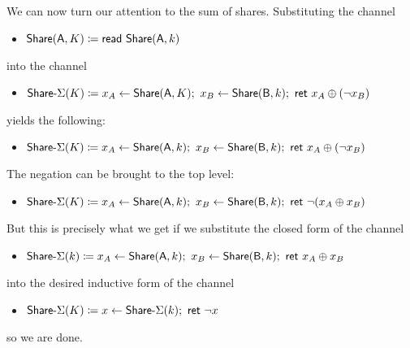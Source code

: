 \begin{itemize}
We can now turn our attention to the sum of shares. Substituting the channel
\begin{itemize}
\item $\mathsf{Share}(\mathsf{A},K) \coloneqq \mathsf{read} \ \mathsf{Share}(\mathsf{A},k)$
\end{itemize}
into the channel
\begin{itemize}
\item $\mathsf{Share}\textsf{-}\Sigma(K) \coloneqq x_A \leftarrow \mathsf{Share}(\mathsf{A},K); \ x_B \leftarrow \mathsf{Share}(\mathsf{B},k); \ \mathsf{ret} \ x_A \oplus (\neg x_B)$
\end{itemize}
yields the following:
\begin{itemize}
\item $\mathsf{Share}\textsf{-}\Sigma(K) \coloneqq x_A \leftarrow \mathsf{Share}(\mathsf{A},k); \ x_B \leftarrow \mathsf{Share}(\mathsf{B},k); \ \mathsf{ret} \ x_A \oplus (\neg x_B)$
\end{itemize}
The negation can be brought to the top level:
\begin{itemize}
\item $\mathsf{Share}\textsf{-}\Sigma(K) \coloneqq x_A \leftarrow \mathsf{Share}(\mathsf{A},k); \ x_B \leftarrow \mathsf{Share}(\mathsf{B},k); \ \mathsf{ret} \ \neg (x_A \oplus x_B)$
\end{itemize}
But this is precisely what we get if we substitute the closed form of the channel
\begin{itemize}
\item $\mathsf{Share}\textsf{-}\Sigma(k) \coloneqq x_A \leftarrow \mathsf{Share}(\mathsf{A},k); \ x_B \leftarrow \mathsf{Share}(\mathsf{B},k); \ \mathsf{ret} \ x_A \oplus x_B$
\end{itemize}
into the desired inductive form of the channel
\begin{itemize}
\item $\mathsf{Share}\textsf{-}\Sigma(K) \coloneqq x \leftarrow \mathsf{Share}\textsf{-}\Sigma(k); \ \mathsf{ret} \ \neg x$
\end{itemize}
so we are done.


\end{itemize}
